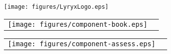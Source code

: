 \setlength{\parskip}{0pt}
\thispagestyle{empty}


\vspace{-3em}
\begin{center}
  \texttt{[image: figures/LyryxLogo.eps]}

  \vspace{2em}
  \textcolor{lscstextcolour}{\textbf{\fontsize{24}{28}\selectfont {Champions of Access to Knowledge}}}
\end{center}

\vfill

\begin{multicols}{2}
  \begin{center}
    \begin{lscshdrbox}
      \begin{tabu}{X[1,c,m] X[2,l,m]}
        \vspace{0pt}
        \texttt{[image: figures/component-book.eps]}
        &
        \vspace{0pt}
        \textcolor{white}{\textbf{\fontsize{14}{20}\selectfont {OPEN TEXT}}}
      \end{tabu}
    \end{lscshdrbox}
  \end{center}

  \columnbreak

  \begin{center}
    \begin{lscshdrbox}
      \begin{tabu}{X[1,c,m] X[2,l,m]}
        \vspace{0pt}
        \texttt{[image: figures/component-assess.eps]}
        &
        \vspace{0pt}
        \textcolor{white}{\textbf{\fontsize{14}{20}\selectfont {ONLINE ASSESSMENT}}}
      \end{tabu}
    \end{lscshdrbox}
  \end{center}
\end{multicols}

